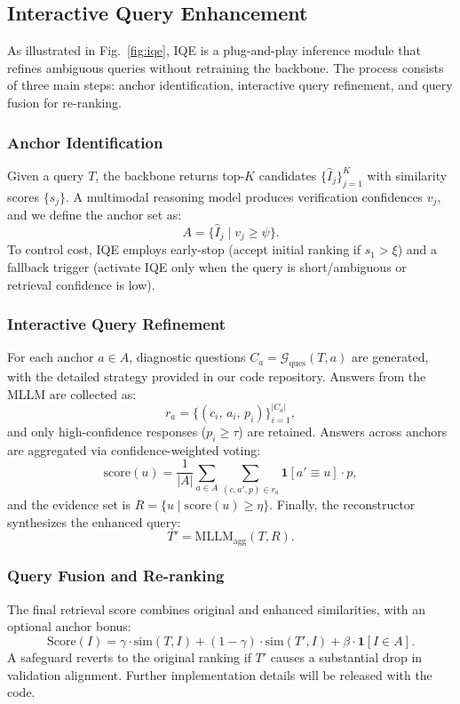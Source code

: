 \documentclass{article}
\begin{document}
\subsection{Interactive Query Enhancement }
As illustrated in Fig.~\ref{fig:iqe}, IQE is a plug-and-play inference module that refines ambiguous queries without retraining the backbone. The process consists of three main steps: anchor identification, interactive query refinement, and query fusion for re-ranking.



\setcounter{equation}{8}

\subsubsection{Anchor Identification}
Given a query $T$, the backbone returns top-$K$ candidates $\{\hat I_j\}_{j=1}^K$ with similarity scores $\{s_j\}$. A multimodal reasoning model produces verification confidences $v_j$, and we define the anchor set as:
\begin{equation}
A=\{\hat I_j \mid v_j\ge\psi\}.
\end{equation}
To control cost, IQE employs early-stop (accept initial ranking if $s_1>\xi$) and a fallback trigger (activate IQE only when the query is short/ambiguous or retrieval confidence is low).


\subsubsection{Interactive Query Refinement}
For each anchor $a\in A$, diagnostic questions $C_a=\mathcal{G}_{\text{ques}}(T,a)$ are generated, with the detailed strategy provided in our code repository. Answers from the MLLM are collected as:
\begin{equation}
r_a = \{(c_i,\, a_i,\, p_{i})\}_{i=1}^{|C_a|},
\end{equation}
and only high-confidence responses ($p_i\ge\tau$) are retained. Answers across anchors are aggregated via confidence-weighted voting:
\[
\mathrm{score}(u)=\frac{1}{|A|}\sum_{a\in A}\sum_{(c,a',p)\in r_a}\mathbf{1}[a'\equiv u]\cdot p,
\]
and the evidence set is $R=\{u\mid \mathrm{score}(u)\ge\eta\}$. Finally, the reconstructor synthesizes the enhanced query:
\begin{equation}
T'=\mathrm{MLLM}_{\text{agg}}(T,R).
\end{equation}


\subsubsection{Query Fusion and Re-ranking}
The final retrieval score combines original and enhanced similarities, with an optional anchor bonus:
\begin{equation}
\mathrm{Score}(I)=\gamma\cdot\mathrm{sim}(T,I)+(1-\gamma)\cdot\mathrm{sim}(T',I)+\beta\cdot\mathbf{1}[I\in A].
\end{equation}
A safeguard reverts to the original ranking if $T'$ causes a substantial drop in validation alignment. Further implementation details will be released with the code.
\end{document}
